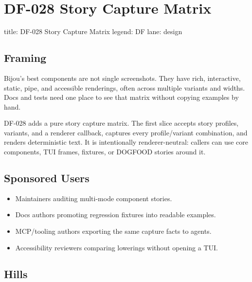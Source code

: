 \chapter{DF-028 Story Capture Matrix}\label{record-089}

\smallskip

\begin{RecordMeta}
title: DF-028 Story Capture Matrix
legend: DF
lane: design

\end{RecordMeta}

\section{Framing}\label{record-089-framing}

Bijou's best components are not single screenshots. They have rich, interactive, static, pipe, and accessible renderings, often across multiple variants and widths. Docs and tests need one place to see that matrix without copying examples by hand.

DF-028 adds a pure story capture matrix. The first slice accepts story profiles, variants, and a renderer callback, captures every profile/variant combination, and renders deterministic text. It is intentionally renderer-neutral: callers can use core components, TUI frames, fixtures, or DOGFOOD stories around it.

\section{Sponsored Users}\label{record-089-sponsored-users}

\begin{itemize}
\tightlist
\item
  Maintainers auditing multi-mode component stories.
\item
  Docs authors promoting regression fixtures into readable examples.
\item
  MCP/tooling authors exporting the same capture facts to agents.
\item
  Accessibility reviewers comparing lowerings without opening a TUI.
\end{itemize}

\section{Hills}\label{record-089-hills}

